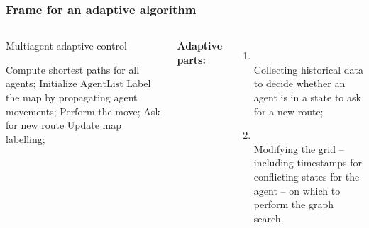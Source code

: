 \documentclass[12pt,aspectratio=169]{beamer}
\begin{document}
\begin{frame}[fragile,t]
  \frametitle{Frame for an adaptive algorithm}

{
\begin{columns}

\vspace*{-0.7cm}
\begin{minipage}{\linewidth}
  \begin{alertblock}{Multiagent adaptive control}
  \begin{algorithmic}[1]
  \State Compute shortest paths for \alert{all agents};
  \State Initialize $\mathrm{AgentList}$ 
  \State Label the map by propagating agent movements;
   
  \State Perform the move;
  \Else   {}
  \State Ask for new route
  \EndIf
  \State Update map labelling;
  \EndFor
  \EndWhile
  \end{algorithmic}
  \end{alertblock}
\end{minipage}

\vspace*{-0.5cm}

\textbf{Adaptive parts:}
\begin{enumerate}
\item {}\\
  Collecting historical data to decide whether an agent is in \alert{a state} to ask for a new route;\vspace*{.5cm}

\item {}\\
  Modifying the grid -- including timestamps for conflicting states for the agent -- on which to perform the graph search.
\end{enumerate}
\end{columns}

}
\end{frame}
\end{document}
